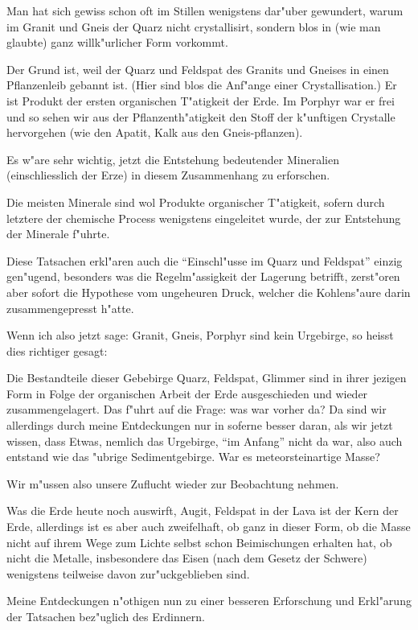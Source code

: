 \documentclass[a4paper, 11pt, oneside, german]{article}
\begin{document}
Man hat sich gewiss schon oft im Stillen wenigstens dar"uber gewundert, warum im Granit und Gneis der Quarz nicht crystallisirt, sondern blos in (wie man glaubte) ganz willk"urlicher Form vorkommt.

Der Grund ist, weil der Quarz und Feldspat des Granits und Gneises in einen Pflanzenleib gebannt ist. (Hier sind blos die Anf"ange einer Crystallisation.) Er ist Produkt der ersten organischen T"atigkeit der Erde. Im Porphyr war er frei und so sehen wir aus der Pflanzenth"atigkeit den Stoff der k"unftigen Crystalle hervorgehen (wie den Apatit, Kalk aus den Gneis-pflanzen).

Es w"are sehr wichtig, jetzt die Entstehung bedeutender Mineralien (einschliesslich der Erze) in diesem Zusammenhang zu erforschen.

Die meisten Minerale sind wol Produkte organischer T"atigkeit, sofern durch letztere der chemische Process wenigstens eingeleitet wurde, der zur Entstehung der Minerale f"uhrte.

Diese Tatsachen erkl"aren auch die "`Einschl"usse im Quarz und Feldspat"' einzig gen"ugend, besonders was die Regelm"assigkeit der Lagerung betrifft, zerst"oren aber sofort die Hypothese vom ungeheuren Druck, welcher die Kohlens"aure darin zusammengepresst h"atte.

Wenn ich also jetzt sage: Granit, Gneis, Porphyr sind kein Urgebirge, so heisst dies richtiger gesagt:

Die Bestandteile dieser Gebebirge Quarz, Feldspat, Glimmer sind in ihrer jezigen Form in Folge der organischen Arbeit der Erde ausgeschieden und wieder zusammengelagert. Das f"uhrt auf die Frage: was war vorher da? Da sind wir allerdings durch meine Entdeckungen nur in soferne besser daran, als wir jetzt wissen, dass Etwas, nemlich das Urgebirge, "`im Anfang"' nicht da war, also auch entstand wie das "ubrige Sedimentgebirge. War es meteorsteinartige Masse?

Wir m"ussen also unsere Zuflucht wieder zur Beobachtung nehmen.

Was die Erde heute noch auswirft, Augit, Feldspat in der Lava ist der Kern der Erde, allerdings ist es aber auch zweifelhaft, ob ganz in dieser Form, ob die Masse nicht auf ihrem Wege zum Lichte selbst schon Beimischungen erhalten hat, ob nicht die Metalle, insbesondere das Eisen (nach dem Gesetz der Schwere) wenigstens teilweise davon zur"uckgeblieben sind.

Meine Entdeckungen n"othigen nun zu einer besseren Erforschung und Erkl"arung der Tatsachen bez"uglich des Erdinnern.
\end{document}
